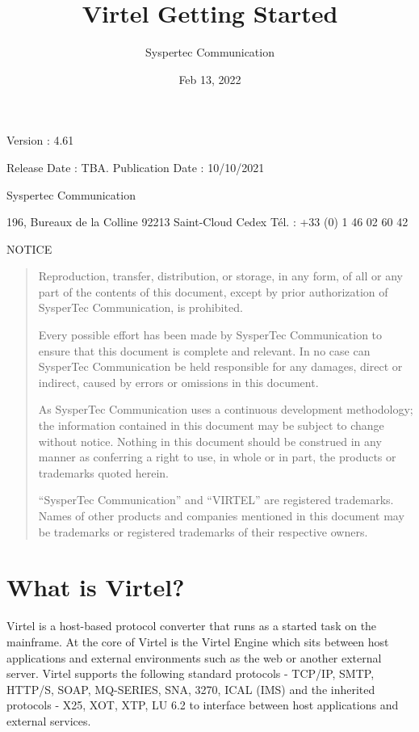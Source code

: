 \documentclass[letterpaper,10pt,english]{sphinxmanual}
\title{Virtel Getting Started}
\date{Feb 13, 2022}
\author{Syspertec Communication}
\begin{document}
\pagestyle{empty}
\sphinxmaketitle
\pagestyle{plain}
\sphinxtableofcontents
\pagestyle{normal}
\label{\detokenize{Getting_Started::doc}}



Version : 4.61

Release Date : TBA. Publication Date : 10/10/2021

Syspertec Communication

196, Bureaux de la Colline 92213 Saint-Cloud Cedex Tél. : +33 (0) 1 46 02 60 42


NOTICE
\begin{quote}

Reproduction, transfer, distribution, or storage, in any form, of all or any part of
the contents of this document, except by prior authorization of SysperTec
Communication, is prohibited.

Every possible effort has been made by SysperTec Communication to ensure that this document
is complete and relevant. In no case can SysperTec Communication be held responsible for
any damages, direct or indirect, caused by errors or omissions in this document.

As SysperTec Communication uses a continuous development methodology; the information
contained in this document may be subject to change without notice. Nothing in this
document should be construed in any manner as conferring a right to use, in whole or in
part, the products or trademarks quoted herein.

“SysperTec Communication” and “VIRTEL” are registered trademarks. Names of other products
and companies mentioned in this document may be trademarks or registered trademarks of
their respective owners.
\end{quote}


\chapter{What is Virtel?}
\label{\detokenize{Getting_Started:what-is-virtel}}
Virtel is a host-based protocol converter that runs as a started task on the mainframe. At the core of Virtel is the Virtel Engine which sits between host applications and external environments such as the web or another external server. Virtel supports the following standard protocols - TCP/IP, SMTP, HTTP/S, SOAP, MQ-SERIES, SNA, 3270, ICAL (IMS) and the inherited protocols - X25, XOT, XTP, LU 6.2 to interface between host applications and external services.
\end{document}
